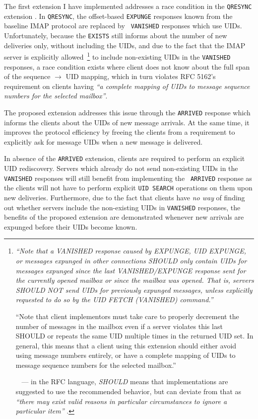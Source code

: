 \documentclass[trojita]{subfiles}
\begin{document}
The first extension I have implemented addresses a race condition in the {\tt QRESYNC} extension \cite{rfc5162}.  In
{\tt QRESYNC}, the offset-based {\tt EXPUNGE} responses known from the baseline IMAP protocol are replaced by {\tt
VANISHED} responses which use UIDs.  Unfortunately, because the {\tt EXISTS} still informs about the number of new
deliveries only, without including the UIDs, and due to the fact that the IMAP server is explicitly
allowed~\footnote{{\em``Note that a VANISHED response caused by EXPUNGE, UID EXPUNGE, or messages expunged in other
connections SHOULD only contain UIDs for messages expunged since the last VANISHED/EXPUNGE response sent for the
currently opened mailbox or since the mailbox was opened.  That is, servers SHOULD NOT send UIDs for previously expunged
messages, unless explicitly requested to do so by the UID FETCH (VANISHED) command.''

``Note that client implementors must take care to properly decrement the number of messages in the mailbox even if
a server violates this last SHOULD or repeats the same UID multiple times in the returned UID set.  In general, this
means that a client using this extension should either avoid using message numbers entirely, or have a complete mapping
of UIDs to message sequence numbers for the selected mailbox.''}~\cite[p. 12]{rfc5162} --- in the
RFC language, {\em SHOULD} means that implementations are suggested to use the recommended behavior, but can deviate
from that as {\em ``there may exist valid reasons in particular circumstances to ignore a particular item''}
\cite{rfc2092}.} to include non-existing UIDs in the {\tt VANISHED} responses, a race condition exists where client does
not know about the full span of the sequence $\rightarrow$ UID mapping, which in turn violates RFC 5162's requirement
on clients having {\em ``a complete mapping of UIDs to message sequence numbers for the selected mailbox''}.

The proposed extension addresses this issue through the {\tt ARRIVED} response which informs the clients about the UIDs
of new message arrivals.  At the same time, it improves the protocol efficiency by freeing the clients from a
requirement to explicitly ask for message UIDs when a new message is delivered.

In absence of the {\tt ARRIVED} extension, clients are required to perform an explicit UID rediscovery.  Servers which
already do not send non-existing UIDs in the {\tt VANISHED} responses will still benefit from implementing the {\tt
ARRIVED} response as the clients will not have to perform explicit {\tt UID SEARCH} operations on them upon new
deliveries.  Furthermore, due to the fact that clients have {\em no way} of finding out whether servers include the
non-existing UIDs in {\tt VANISHED} responses, the benefits of the proposed extension are demonstrated whenever new
arrivals are expunged before their UIDs become known.
\end{document}
